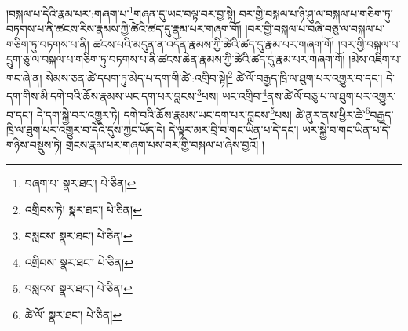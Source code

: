 །བསྐལ་པ་དེའི་རྣམ་པར་:གཞག་པ་\footnote{བཞག་པ་  སྣར་ཐང་།  པེ་ཅིན། }གཞན་དུ་ཡང་བལྟ་བར་བྱ་སྟེ། བར་གྱི་བསྐལ་པ་ཉི་ཤུ་ལ་བསྐལ་པ་གཅིག་ཏུ་བཏགས་པ་ནི་ཚངས་རིས་རྣམས་ཀྱི་ཚེའི་ཚད་དུ་རྣམ་པར་གཞག་གོ། །བར་གྱི་བསྐལ་པ་བཞི་བཅུ་ལ་བསྐལ་པ་གཅིག་ཏུ་བཏགས་པ་ནི། ཚངས་པའི་མདུན་ན་འདོན་རྣམས་ཀྱི་ཚེའི་ཚད་དུ་རྣམ་པར་གཞག་གོ། །བར་གྱི་བསྐལ་པ་དྲུག་ཅུ་ལ་བསྐལ་པ་གཅིག་ཏུ་བཏགས་པ་ནི་ཚངས་ཆེན་རྣམས་ཀྱི་ཚེའི་ཚད་དུ་རྣམ་པར་གཞག་གོ། །མེས་འཇིག་པ་གང་ཞེ་ན། སེམས་ཅན་ཚེ་དཔག་ཏུ་མེད་པ་དག་གི་ཚེ་:འགྲིབ་སྟེ།\footnote{འགྲིབས་ཏེ།  སྣར་ཐང་།  པེ་ཅིན། } ཚེ་ལོ་བརྒྱད་ཁྲི་ལ་ཐུག་པར་འགྱུར་བ་དང་། དེ་དག་གིས་མི་དགེ་བའི་ཆོས་རྣམས་ཡང་དག་པར་བླངས་\footnote{བསླངས་  སྣར་ཐང་།  པེ་ཅིན། }པས། ཡང་འགྲིབ་\footnote{འགྲིབས་  སྣར་ཐང་།  པེ་ཅིན། }ནས་ཚེ་ལོ་བཅུ་པ་ལ་ཐུག་པར་འགྱུར་བ་དང་། དེ་དག་སྐྱེ་བར་འགྱུར་ཏེ། དགེ་བའི་ཆོས་རྣམས་ཡང་དག་པར་བླངས་\footnote{བསླངས་  སྣར་ཐང་།  པེ་ཅིན། }པས། ཚེ་ནུར་ནས་ཕྱིར་ཚེ་\footnote{ཚེ་ལོ་  སྣར་ཐང་།  པེ་ཅིན། }བརྒྱད་ཁྲི་ལ་ཐུག་པར་འགྱུར་བ་དེའི་དུས་ཀྱང་ཡོད་དེ། དེ་ལྟར་མར་བྲི་བ་གང་ཡིན་པ་དེ་དང་། ཡར་སྐྱེ་བ་གང་ཡིན་པ་དེ་གཉིས་བསྡུས་ཏེ། གྲངས་རྣམ་པར་གཞག་པས་བར་གྱི་བསྐལ་པ་ཞེས་བྱའོ། །

